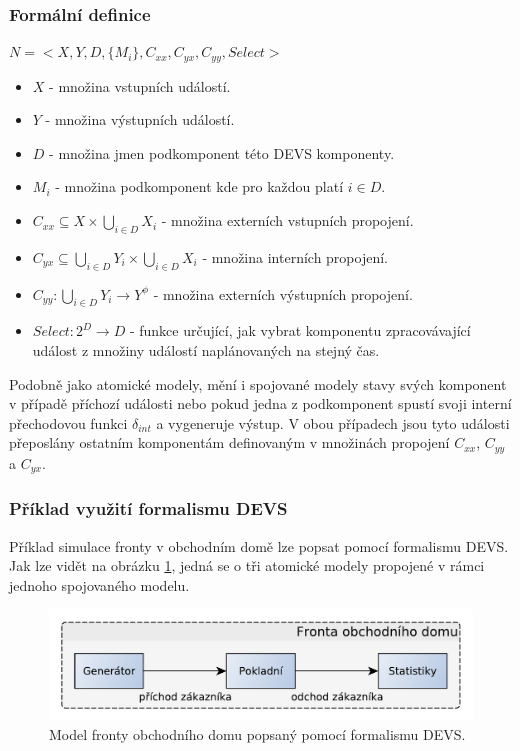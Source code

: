 \subsubsection{Formální definice}

\begin{math}
N=<X,Y,D,\{M_i\},C_{xx}, C_{yx}, C_{yy}, Select>
\end{math}

\begin{itemize}
\item $X$ - množina vstupních událostí.
\item $Y$ - množina výstupních událostí.
\item $D$ - množina jmen podkomponent této DEVS komponenty.
\item $M_i$ - množina podkomponent kde pro každou platí $i \in D$.
\item $C_{xx}\subseteq X \times \bigcup_{i \in D} X_i$ - množina externích vstupních propojení.
\item $C_{yx}\subseteq \bigcup_{i \in D} Y_i \times \bigcup_{i \in D} X_i$ - množina interních propojení.
\item $C_{yy}: \bigcup_{i \in D} Y_i \rightarrow Y^\phi$ - množina externích výstupních propojení.
\item $Select:2^D \rightarrow D$ - funkce určující, jak vybrat komponentu zpracovávající událost z množiny událostí naplánovaných na stejný čas.
\end{itemize}

Podobně jako atomické modely, mění i spojované modely stavy svých komponent v případě příchozí události nebo pokud jedna z podkomponent spustí svoji interní přechodovou funkci $\delta_{int}$ a vygeneruje výstup. V obou případech jsou tyto události přeposlány ostatním komponentám definovaným v množinách propojení $C_{xx}$, $C_{yy}$ a $C_{yx}$.

\subsubsection{Příklad využití formalismu DEVS}

Příklad simulace fronty v obchodním domě lze popsat pomocí formalismu DEVS. Jak lze vidět na obrázku \ref{fig:fronta}, jedná se o tři atomické modely propojené v rámci jednoho spojovaného modelu.

\begin{figure}[ht]
\centering
\includegraphics[trim=0cm 0cm 0cm 0cm, scale=0.7]{fig/fronta}
\caption{Model fronty obchodního domu popsaný pomocí formalismu DEVS.}
\label{fig:fronta}
\end{figure}

